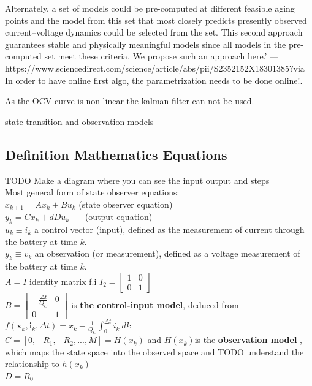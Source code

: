 Alternately, a set of models could be pre-computed at different feasible aging points and the model from this set that most closely predicts presently observed current–voltage dynamics could be selected from the set. This second approach guarantees stable and physically meaningful models since all models in the pre-computed set meet these criteria. We propose such an approach here.' 
---https://www.sciencedirect.com/science/article/abs/pii/S2352152X18301385?via%
In order to have online first algo, the parametrization needs to be done online!. 

As the OCV curve is non-linear the kalman filter can not be used. 

state transition and observation models


\subsection{Definition Mathematics Equations }
 
TODO Make a diagram where you can see the input output and steps\\


Most general form of  state observer equations: \\
$ x_{k+1}=Ax_{k}+Bu_{k} $ (state observer equation) \\
$ y_{k}=Cx_{k}+dDu_{k} $ \ \ \  (output equation)\\ 

$u_{k} \equiv i_{k}$ a control vector (input), defined as the measurement of current through the battery at time $k$. \\ 
$y_{k} \equiv v_{k}$ an observation (or measurement), defined as a voltage measurement of the battery at time $k$. \\
$A = I$  identity matrix f.i $I_{2}=\begin{bmatrix}1&0\\0&1\end{bmatrix}$ \\
$B = \begin{bmatrix}-\frac{\Delta t}{{Q_{C}}}&0\\0&1\end{bmatrix} $  is \textbf{the control-input model}, deduced from  $f({\boldsymbol {x}}_{k},{\boldsymbol {i}}_{k},\Delta t) =  {x}_{k} - \frac{1}{{Q_{C}}}\int_{0}^{\Delta t} {i_{k}\ dk} $ \\
$ C = [0, -R_1, -R_2, ..., M] = H(x_k) $ and $H(x_k) $is the \textbf{observation model} , which maps the state space into the observed space and TODO understand the relationship to $ h(x_k)$ \\ 
$ D = R_0 $ \\


